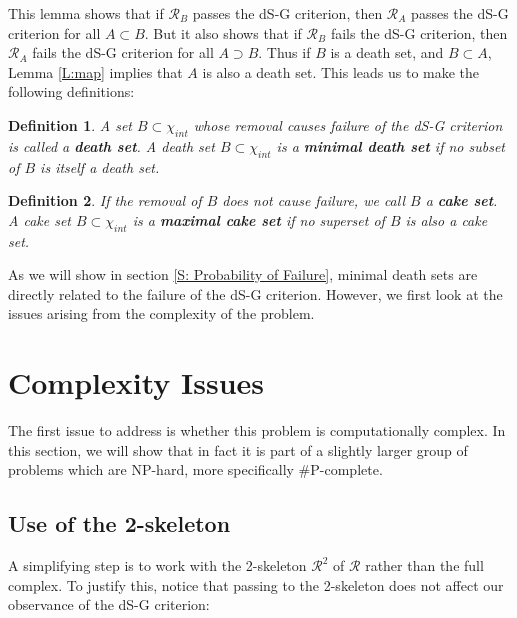 \documentclass[10pt,twocolumn]{article} \usepackage{amsmath,epsf,amssymb,cite,pifont,amsthm, mathrsfs,epsfig,  bbm, amsthm,  setspace}
\newtheorem{defn}{Definition}
\newcommand{\RR}{\mathcal R}
\renewcommand{\1}{\mathbbm{1}}
\begin{document}
This lemma shows that if  $\RR_B$ passes the dS-G criterion,
then $\RR_A$ passes the dS-G criterion for all $A\subset B$.
But it also shows that if $\RR_B$ fails the dS-G criterion, then $\RR_A$ fails the dS-G  criterion for all
$A \supset B$.
Thus if  $B$ is a death set, and $B \subset A$,
Lemma \ref{L:map} implies that $A$ is also a death set.
This leads us to make the following definitions:

\begin{defn}
A set $B \subset \chi_{int}$ whose removal causes failure of the dS-G criterion is called a
\textbf{death set}.
A death set $B \subset \chi_{int}$ is a \textbf{minimal death set} if no subset of $B$ is itself a death set.
\end{defn}

\begin{defn}
If the removal of $B$ does not cause failure, we call $B$ a \textbf{cake set}.
A cake set $B \subset \chi_{int}$ is a \textbf{maximal cake set} if no superset of $B$ is also a cake set.
\end{defn}
As we will show in section \ref{S: Probability of Failure}, minimal death sets are directly related to the failure of the dS-G criterion.
However, we first look at the issues arising from the complexity of the problem.




\section{Complexity Issues}\label{S: Complexity}

The first issue to address is whether this problem is computationally complex.
In this section, we will show that  in fact it is part of a slightly larger group of problems which are  NP-hard, more specifically \#P-complete.

\subsection{Use of the 2-skeleton} \label{S: 2-skeleton}
A simplifying step is to work with the 2-skeleton $\RR^2$ of $\RR$ rather than the full complex.
To justify this, notice that passing to the 2-skeleton does not affect our observance of the dS-G criterion:
\end{document}
